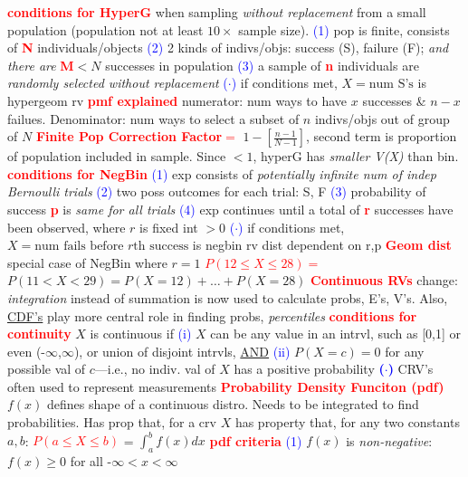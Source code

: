 \documentclass[9pt]{extarticle}
\newcommand{\re}[1]{\textcolor{red}{\textbf{#1}}}
\newcommand{\bt}[1]{\textcolor{blue}{#1}}
\begin{document}
	\re{conditions for HyperG} when sampling \emph{without replacement} from a small population
	(population not at least $10\times$ sample size).
	\bt{(1)} pop is finite, consists of \re{N} individuals/objects
	\bt{(2)} 2 kinds of indivs/objs: success (S), failure (F); \emph{and there are} \re{M}$<N$
	successes in population
	\bt{(3)} a sample of \re{n} individuals are \emph{randomly selected without replacement}
	\bt{(\textbf{$\cdot$})} if conditions met, $X={\text{num S's}}$ is hypergeom rv
	\re{pmf explained} numerator: num ways to have $x$ successes \& $n-x$ failues.
	Denominator: num ways to select a subset of $n$ indivs/objs out of group of $N$
	\re{Finite Pop Correction Factor$=$} $1-[\frac{n-1}{N-1}]$, second term is proportion of population
	included in sample.
	Since $<1$, hyperG has \emph{smaller V(X)} than bin.
	\re{conditions for NegBin}
	\bt{(1)} exp consists of \emph{potentially infinite num of indep Bernoulli trials}
	\bt{(2)} two poss outcomes for each trial: S, F
	\bt{(3)} probability of success \re{p} is \emph{same for all trials}
	\bt{(4)} exp continues until a total of \re{r} successes have been observed, where $r$ is fixed
	int $>0$
	\bt{(\textbf{$\cdot$})} if conditions met, $X={\text{num fails before $r$th success}}$ is
	negbin rv dist dependent on r,p
	\re{Geom dist} special case of NegBin where $r=1$
	\re{$P(12\leq X\leq 28) =$} $P(11<X<29)=P(X=12)+\ldots+P(X=28)$
	\re{Continuous RVs} change: \emph{integration} instead of summation is now used to calculate
	probs, E's, V's. Also, \underline{CDF's} play more central role in finding probs,
	\emph{percentiles}
	\re{conditions for continuity} $X$ is continuous if
	\bt{(i)} $X$ can be any value in an intrvl,
	such as [0,1] or even (-$\infty$,$\infty$), or union of disjoint intrvls, \underline{AND}
	\bt{(ii)} $P(X=c)=0$ for any possible val of $c$---i.e., no indiv. val of $X$ has a positive
	probability
	\bt{\textbf{($\cdot$)}} CRV's often used to represent measurements
	\re{Probability Density Funciton (pdf)} $f(x)$ defines shape of a continuous distro. Needs to
	be integrated to find probabilities. Has prop that, for a crv $X$ has property that, for any two
	constants $a,b$:
	\re{$P(a\leq X\leq b)$} = $\int_{a}^{b}f(x)dx$
	\re{pdf criteria}
	\bt{(1)} $f(x)$ is \emph{non-negative}: $f(x)\geq 0$ for all -$\infty<x<\infty$
\end{document}
